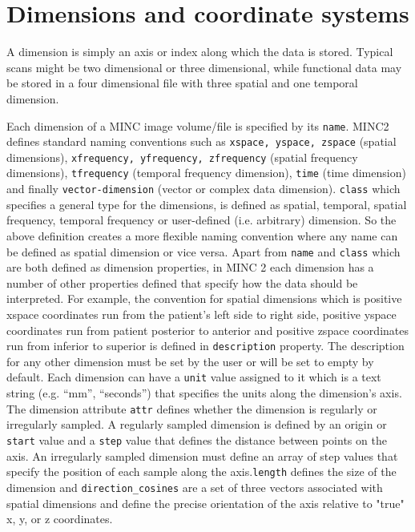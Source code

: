\documentclass{article}
\begin{document}
\section{Dimensions and coordinate systems}
A dimension is simply an axis or index along which the data is stored.  
Typical scans might be two dimensional or three dimensional, while functional 
data may be stored in a four dimensional file with three spatial and one temporal 
dimension.

Each dimension of a MINC image volume/file is specified by its {\tt name}. MINC2 defines
standard naming conventions such as {\tt xspace, yspace, zspace} (spatial 
dimensions), {\tt xfrequency, yfrequency, zfrequency}
(spatial frequency dimensions), {\tt tfrequency} (temporal frequency dimension), {\tt time} 
(time dimension) and finally {\tt vector-dimension} (vector or complex data dimension).
{\tt class} which specifies a general type for the dimensions, is defined as spatial, 
temporal, spatial frequency, temporal frequency or user-defined (i.e. arbitrary) dimension.
So the above definition creates a more flexible naming convention where any name can be defined
as spatial dimension or vice versa. 
Apart from {\tt name} and {\tt class} which are both defined as dimension properties, 
in MINC 2 each dimension has a number 
of other properties defined that specify how the data should be interpreted.
For example, the convention for spatial dimensions which is positive xspace coordinates 
run from the patient's left side to right side, 
positive yspace coordinates run from patient posterior to anterior 
and positive zspace coordinates run from inferior to superior is defined in 
{\tt description} property. The description for any other dimension must be set by the user 
or will be set to empty by default. Each dimension can have a {\tt unit} 
value assigned to it which is a text string (e.g. ``mm'', ``seconds'') that 
specifies the units along the dimension's axis. The dimension attribute {\tt attr}
defines whether the dimension is regularly or irregularly sampled. A regularly 
sampled dimension is defined by an origin or {\tt start} value and a {\tt step}
value that defines the distance between points on the axis. An irregularly 
sampled dimension must define an array of step values that specify 
the position of each sample along the axis.{\tt length} defines the size of the dimension
and {\tt direction\_cosines} are a set of three vectors associated with spatial dimensions
and define the precise orientation of the axis relative to "true" x, y, or z coordinates.
\end{document}
